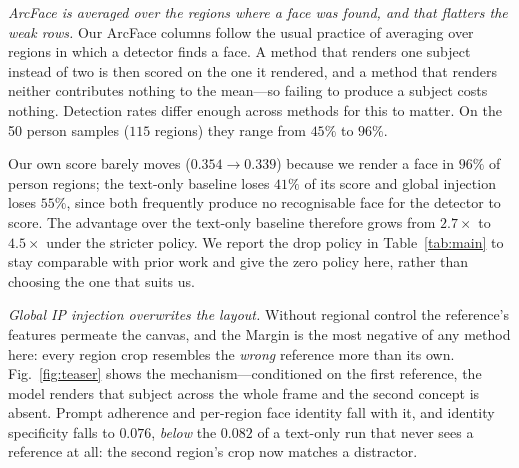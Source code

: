 \documentclass[10pt,twocolumn,letterpaper]{article}
\begin{document}
\noindent\textit{ArcFace is averaged over the regions where a face was found,
and that flatters the weak rows.}
Our ArcFace columns follow the usual practice of averaging over regions in
which a detector finds a face.  A method that renders one subject instead of
two is then scored on the one it rendered, and a method that renders neither
contributes nothing to the mean---so failing to produce a subject costs
nothing.  Detection rates differ enough across methods for this to matter.  On
the 50 person samples ($115$ regions) they range from $45\%$ to $96\%$.

\begin{table}[htbp]
\centering
\caption{%
  \textbf{Reported ArcFace against the same score with missing faces counted
  as zero.}  Person samples of Mixed-Eval-v1, $115$ regions.  The ranking is
  unchanged, and the margin over every baseline widens, because the baselines
  are the ones that often render no face at all.%
}
\label{tab:detect}
\end{table}

Our own score barely moves ($0.354\!\to\!0.339$) because we render a face in
$96\%$ of person regions; the text-only baseline loses $41\%$ of its score and
global injection loses $55\%$, since both frequently produce no recognisable
face for the detector to score.  The advantage over the text-only baseline
therefore grows from $2.7\times$ to $4.5\times$ under the stricter policy.  We
report the drop policy in Table~\ref{tab:main} to stay comparable with prior
work and give the zero policy here, rather than choosing the one that suits
us.

\noindent\textit{Global IP injection overwrites the layout.}
Without regional control the reference's features permeate the canvas, and the
Margin is the most negative of any method here: every region crop resembles the
\emph{wrong} reference more than its own.  Fig.~\ref{fig:teaser} shows the
mechanism---conditioned on the first reference, the model renders that subject
across the whole frame and the second concept is absent.  Prompt adherence and
per-region face identity fall with it, and identity specificity falls to
$0.076$, \emph{below} the $0.082$ of a text-only run that never sees a
reference at all: the second region's crop now matches a distractor.
\end{document}
